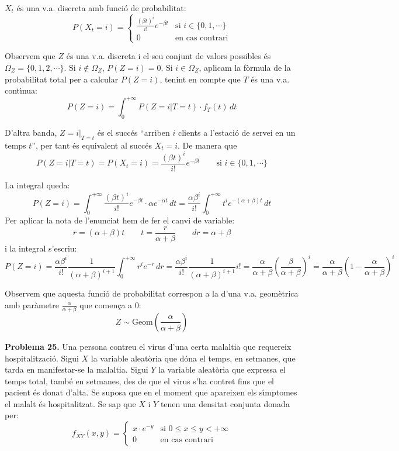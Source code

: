 \documentclass{article}
\begin{document}
\noindent
$X_t$ \'es una v.a. discreta amb funci\'o de probabilitat:
\[
P(X_t=i)=\begin{cases} \frac{(\beta t)^i}{i!} e^{-\beta t} & \text{si } i \in \{0, 1, \cdots \} \\
0 & \text{en cas contrari} \end{cases} 
\]


Observem que $Z$ \'es una v.a. discreta i el seu conjunt de valors possibles \'es 
$\Omega_Z=\{ 0, 1, 2, \cdots \}$. 
Si $i \notin \Omega_Z$, $P(Z=i)=0$. Si $i \in \Omega_Z$, aplicam la f\`ormula de
la probabilitat total per a calcular $P(Z=i)$, tenint en compte que $T$ \'es una v.a. cont\'\i nua:
\[
P(Z=i)=\int_0^{+\infty} P(Z=i | T=t) \cdot f_T(t) \, dt 
\]

\noindent
D'altra banda, $Z=i |_{T=t}$ \'es el succ\'es ``arriben $i$ clients a l'estaci\'o
de servei en un temps $t$'', per tant \'es equivalent al succ\'es $X_t=i$. De
manera que
\[
P(Z=i | T=t)=P(X_t=i)=\frac{(\beta t)^i}{i!} e^{-\beta t} \qquad \text{si } i \in \{0, 1, \cdots \}
\]

\noindent
La integral queda:
\[
P(Z=i)=\int_0^{+\infty} \frac{(\beta t)^i}{i!} e^{-\beta t} \cdot \alpha e^{-\alpha t} \, dt=
\frac{\alpha \beta^i}{i!} \int_0^{+\infty} t^i e^{-(\alpha+\beta)t} \, dt
\]
\noindent
Per aplicar la nota de l'enunciat hem de fer el canvi de variable:
\[
r=(\alpha+\beta)t \qquad t=\frac{r}{\alpha+\beta} \qquad dr=\alpha + \beta
\]
\noindent
i la integral s'escriu:
\[
P(Z=i)= \frac{\alpha \beta^i}{i!} \frac{1}{(\alpha+\beta)^{i+1}} \int_0^{+\infty} r^i e^{-r} \, dr = 
\frac{\alpha \beta^i}{i!} \frac{1}{(\alpha+\beta)^{i+1}} i! = 
\frac{\alpha}{\alpha+\beta} \left( \frac{\beta}{\alpha+\beta} \right)^i = 
\frac{\alpha}{\alpha+\beta} \left( 1-\frac{\alpha}{\alpha+\beta} \right)^i
\]

\noindent
Observem que aquesta funci\'o de probabilitat correspon a la d'una v.a. geom\`etrica amb par\`ametre
$\frac{\alpha}{\alpha+\beta}$ que comen\c{c}a a 0:
\[
Z \sim \mathrm{Geom}(\frac{\alpha}{\alpha+\beta})
\]

\newpage
\noindent
\textbf{Problema 25.}  
Una persona contreu el virus d'una certa malaltia que
requereix hospitalitzaci\'o. Sigui $X$ la variable aleat\`oria que
d\'ona el temps, en setmanes, que tarda en manifestar-se la
malaltia. Sigui $Y$ la variable aleat\`oria que expressa el temps
total, tamb\'e en setmanes, des de que el virus s'ha contret fins
que el pacient \'es donat d'alta. Se suposa que en el moment que
apareixen els s\'{\i}mptomes el malalt \'es hospitalitzat. Se sap que $X$
i $Y$ tenen una densitat conjunta donada per: $$f_{XY}(x,y) = \begin{cases}x
\cdot {e}^{-y} & \text{si   } 0 \leq x \leq y < +\infty \\ 0 & \text{en cas
contrari}\end{cases}$$
\end{document}

